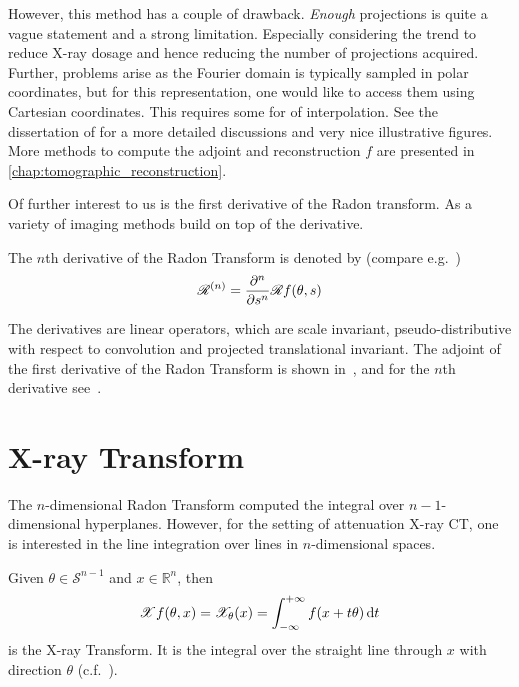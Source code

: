 However, this method has a couple of drawback. \textit{Enough} projections is quite a vague
statement and a strong limitation. Especially considering the trend to reduce X-ray dosage and hence
reducing the number of projections acquired. Further, problems arise as the Fourier domain is
typically sampled in polar coordinates, but for this representation, one would like to access them
using Cartesian coordinates. This requires some for of interpolation. See the dissertation of
\citeauthor{vogel_tomographic_2015}\cite[Chapter~4.1.2]{vogel_tomographic_2015} for a more detailed
discussions and very nice illustrative figures. More methods to compute the adjoint and
reconstruction \(f\) are presented in \autoref{chap:tomographic_reconstruction}.

Of further interest to us is the first derivative of the Radon transform. As a variety of imaging
methods build on top of the derivative.

\begin{definition}
	The \(n\)th derivative of the Radon Transform is denoted by (compare
	e.g.\ \cite{nilchian_differential_2012,nilchian_fast_2013})
	\[ \mathscr{R}^{(n)} = \frac{\partial^n}{\partial s^n} \mathscr{R} f(\theta, s)\]
\end{definition}

The derivatives are linear operators, which are scale invariant, pseudo-distributive with respect to
convolution and projected translational invariant. The adjoint of the first derivative of the Radon
Transform is shown in~\cite{nilchian_differential_2012}, and for the \(n\)th derivative
see~\cite{nilchian_fast_2013}.

\section{X-ray Transform}\label{sec:xray_transform}

The \(n\)-dimensional Radon Transform computed the integral over \(n-1\)-dimensional hyperplanes.
However, for the setting of attenuation X-ray CT, one is interested in the line integration over
lines in \(n\)-dimensional spaces.

\begin{definition}\label{def:x-ray_transform}
	Given \(\theta \in \mathscr{S}^{n-1}\) and \(x \in \mathbb{R}^n\), then
	\[ \mathscr{X} f(\theta, x) = \mathscr{X}_\theta(x) = \int_{-\infty}^{+\infty} f(x + t \theta) \, \mathrm{d}t\]
	is the X-ray Transform. It is the integral over the straight line through \(x\) with
	direction \(\theta\) (c.f.~\cite{natterer_mathematics_1986,solmon_x-ray_1976}).
\end{definition}

